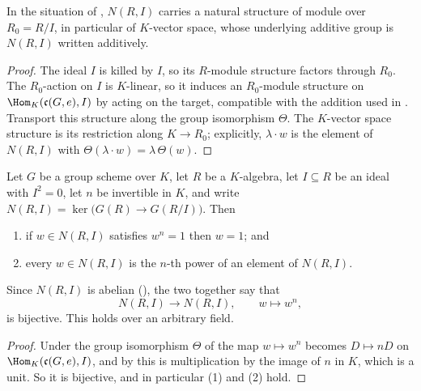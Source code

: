 \begin{corollary}
\label{cor:av-kernel-module}
In the situation of , $N(R,I)$ carries a natural
structure of module over $R_0=R/I$, in particular of $K$-vector space, whose
underlying additive group is $N(R,I)$ written additively.
\end{corollary}
\begin{proof}
The ideal $I$ is killed by $I$, so its $R$-module structure factors through
$R_0$.  The $R_0$-action on $I$ is $K$-linear, so it induces an $R_0$-module
structure on $\Hom_K(\mathfrak c(G,e),I)$ by acting on the target, compatible
with the addition used in .  Transport this
structure along the group isomorphism $\Theta$.  The $K$-vector space structure
is its restriction along $K\to R_0$; explicitly, $\lambda\cdot w$ is the
element of $N(R,I)$ with $\Theta(\lambda\cdot w)=\lambda\,\Theta(w)$.
\end{proof}

\begin{corollary}\label{cor:av-kernel-npow}
\leanok
Let $G$ be a group scheme over $K$, let $R$ be a $K$-algebra, let $I\subseteq R$
be an ideal with $I^2=0$, let $n$ be invertible in $K$, and write
$N(R,I)=\ker\bigl(G(R)\to G(R/I)\bigr)$.  Then
\begin{enumerate}
  \item if $w\in N(R,I)$ satisfies $w^n=1$ then $w=1$; and
  \item every $w\in N(R,I)$ is the $n$-th power of an element of $N(R,I)$.
\end{enumerate}
Since $N(R,I)$ is abelian (), the two together
say that
\[
  N(R,I)\longrightarrow N(R,I),\qquad w\longmapsto w^n,
\]
is bijective.  This holds over an arbitrary field.
\end{corollary}
\begin{proof}
Under the group isomorphism $\Theta$ of  the map
$w\mapsto w^n$ becomes $D\mapsto nD$ on $\Hom_K(\mathfrak c(G,e),I)$, and by
 this is multiplication by the image of $n$ in $K$,
which is a unit.  So it is bijective, and in particular (1) and (2) hold.
\end{proof}

